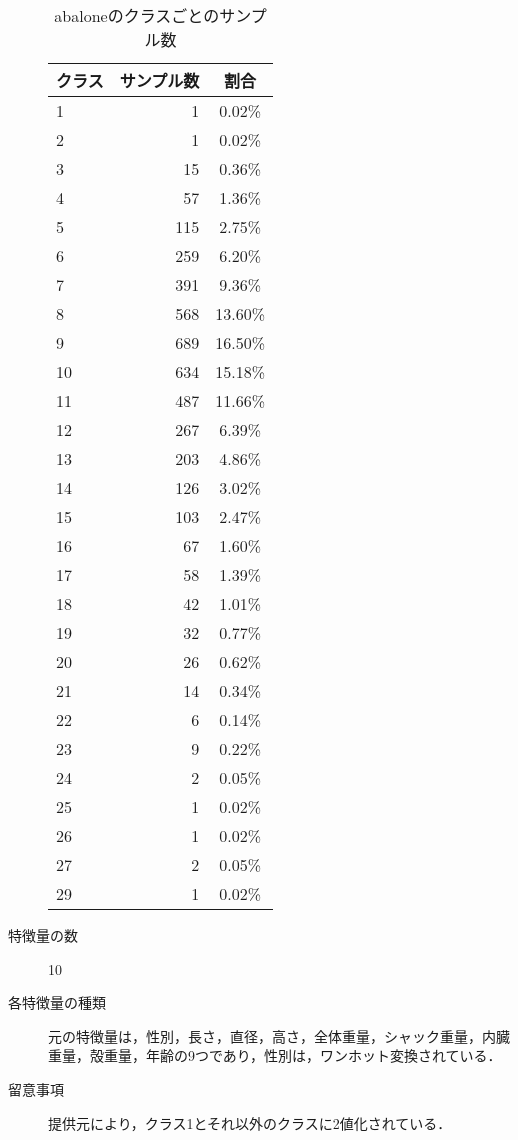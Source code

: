 \begin{description}
    \begin{table}
        \centering
        \caption{abaloneのクラスごとのサンプル数}
        \label{tab:abalone}
        \begin{tabular}{lrc} \hline
            \multicolumn{1}{c}{クラス} &
            \multicolumn{1}{c}{サンプル数} &
            \multicolumn{1}{c}{割合} \\
            \hline
            \hline
            1 & 1 & 0.02\% \\
            2 & 1 & 0.02\% \\
            3 & 15 & 0.36\% \\
            4 & 57 & 1.36\% \\
            5 & 115 & 2.75\% \\
            6 & 259 & 6.20\% \\
            7 & 391 & 9.36\% \\
            8 & 568 & 13.60\% \\
            9 & 689 & 16.50\% \\
            10 & 634 & 15.18\% \\
            11 & 487 & 11.66\% \\
            12 & 267 & 6.39\% \\
            13 & 203 & 4.86\% \\
            14 & 126 & 3.02\% \\
            15 & 103 & 2.47\% \\
            16 & 67 & 1.60\% \\
            17 & 58 & 1.39\% \\
            18 & 42 & 1.01\% \\
            19 & 32 & 0.77\% \\
            20 & 26 & 0.62\% \\
            21 & 14 & 0.34\% \\
            22 & 6 & 0.14\% \\
            23 & 9 & 0.22\% \\
            24 & 2 & 0.05\% \\
            25 & 1 & 0.02\% \\
            26 & 1 & 0.02\% \\
            27 & 2 & 0.05\% \\
            29 & 1 & 0.02\% \\
            \hline
        \end{tabular}
    \end{table}

    \item[特徴量の数] 10
    \item[各特徴量の種類] \mbox{}
        元の特徴量は，性別，長さ，直径，高さ，全体重量，シャック重量，内臓重量，殻重量，年齢の9つであり，性別は，ワンホット変換されている．
    \item[留意事項] 提供元により，クラス1とそれ以外のクラスに2値化されている．
\end{description}


